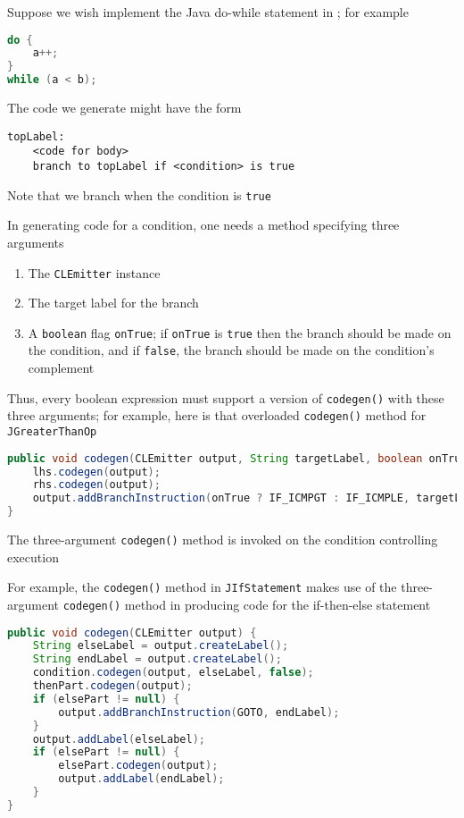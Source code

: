 \documentclass[8pt,a4paper,compress]{beamer}
\begin{document}
\begin{frame}[fragile]
\pause

Suppose we wish implement the Java do-while statement in \jmm; for example
\begin{lstlisting}[language=Java]
do {
    a++;
}
while (a < b);
\end{lstlisting}

The code we generate might have the form
\begin{lstlisting}[language={}]
topLabel:
    <code for body>
    branch to topLabel if <condition> is true
\end{lstlisting}

Note that we branch when the condition is \lstinline{true}

\pause
\bigskip

In generating code for a condition, one needs a method specifying three arguments
\begin{enumerate}
\item The \lstinline{CLEmitter} instance
\item The target label for the branch
\item A \lstinline{boolean} flag \lstinline{onTrue}; if \lstinline{onTrue} is \lstinline{true} then the branch should be made on the condition, and if \lstinline{false}, the branch should be made on the condition's complement
\end{enumerate}

\pause
\bigskip

Thus, every boolean expression must support a version of \lstinline{codegen()} with these three arguments;  for example, here is that overloaded \lstinline{codegen()} method for \lstinline{JGreaterThanOp}
\begin{lstlisting}[language=Java]
public void codegen(CLEmitter output, String targetLabel, boolean onTrue) {
    lhs.codegen(output);
    rhs.codegen(output);
    output.addBranchInstruction(onTrue ? IF_ICMPGT : IF_ICMPLE, targetLabel);
}
\end{lstlisting}
\end{frame}

\begin{frame}[fragile]
\pause

The three-argument \lstinline{codegen()} method is invoked on the condition controlling execution

\pause
\bigskip

For example, the \lstinline{codegen()} method in \lstinline{JIfStatement} makes use of the three-argument \lstinline{codegen()} method in producing code for the if-then-else statement
\begin{lstlisting}[language=Java]
public void codegen(CLEmitter output) {
    String elseLabel = output.createLabel();
    String endLabel = output.createLabel();
    condition.codegen(output, elseLabel, false);
    thenPart.codegen(output);
    if (elsePart != null) {
        output.addBranchInstruction(GOTO, endLabel);
    }
    output.addLabel(elseLabel);
    if (elsePart != null) {
        elsePart.codegen(output);
        output.addLabel(endLabel);
    }
}
\end{lstlisting}
\end{frame}
\end{document}
